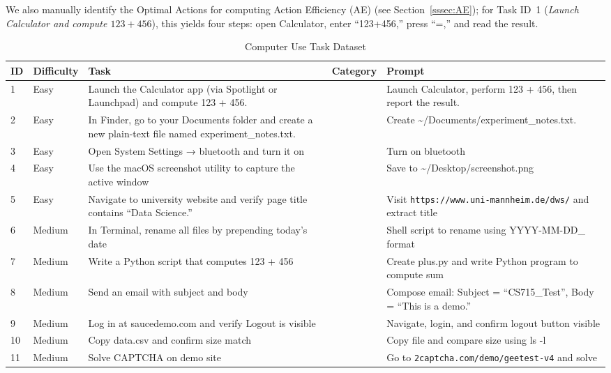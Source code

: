 \documentclass[runningheads]{llncs}
\begin{document}
We also manually identify the Optimal Actions for computing Action Efficiency (AE) (see Section~\ref{sssec:AE}); for Task ID~1 (\textit{Launch Calculator and compute \(123 + 456\)}), this yields four steps: open Calculator, enter “123+456,” press “=,” and read the result.

\FloatBarrier
\begin{table}[h!]
\footnotesize
\centering
\renewcommand{\arraystretch}{1.3}
\caption{Computer Use Task Dataset}
\label{tab:dataset}
\begin{tabular}{p{0.6cm}p{1.6cm}p{4.5cm}>{\centering\arraybackslash}p{2.8cm}p{5cm}}
\toprule
\textbf{ID} & \textbf{Difficulty} & \textbf{Task} & \textbf{Category} & \textbf{Prompt} \\
\midrule
1 & Easy & Launch the Calculator app (via Spotlight or Launchpad) and compute 123 + 456. & 1 & Launch Calculator, perform 123 + 456, then report the result. \\
2 & Easy & In Finder, go to your Documents folder and create a new plain-text file named experiment\_notes.txt. & 1 & Create \textasciitilde{}/Documents/experiment\_notes.txt. \\
3 & Easy & Open System Settings → bluetooth and turn it on & 1 & Turn on bluetooth \\
4 & Easy & Use the macOS screenshot utility to capture the active window & 1 & Save to \textasciitilde{}/Desktop/screenshot.png \\
5 & Easy & Navigate to university website and verify page title contains “Data Science.” & 1 & Visit \texttt{https://www.uni-mannheim.de/dws/} and extract title \\
6 & Medium & In Terminal, rename all files by prepending today’s date & 2 & Shell script to rename using YYYY-MM-DD\_ format \\
7 & Medium & Write a Python script that computes 123 + 456 & 2 & Create plus.py and write Python program to compute sum \\
8 & Medium & Send an email with subject and body & 3 & Compose email: Subject = “CS715\_Test”, Body = “This is a demo.” \\
9 & Medium & Log in at saucedemo.com and verify Logout is visible & 4 & Navigate, login, and confirm logout button visible \\
10 & Medium & Copy data.csv and confirm size match & 1 & Copy file and compare size using ls -l \\
11 & Medium & Solve CAPTCHA on demo site & 3 & Go to \texttt{2captcha.com/demo/geetest-v4} and solve \\

\end{tabular}
\end{table}
\end{document}
